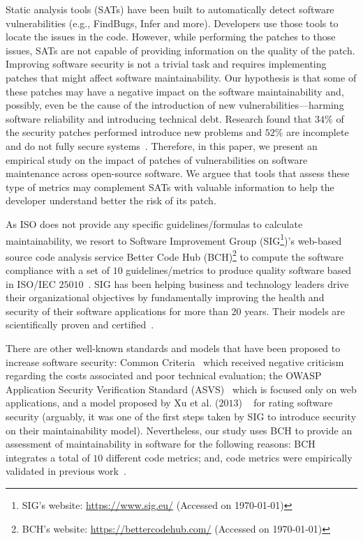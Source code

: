 \documentclass[smallextended]{svjour3}       %
\begin{document}
%
Static analysis tools (SATs) have been built to automatically detect software 
vulnerabilities (e.g., FindBugs, Infer and more). Developers
use those tools to locate the issues in the code. However,
while performing the patches to those issues, SATs are not 
capable of providing information on the quality of the patch.
Improving software security is not a trivial task and 
requires implementing patches that might affect software 
maintainability. Our hypothesis is that some of these patches may 
have a negative impact on the software maintainability and, 
possibly, even be the cause of the introduction of new 
vulnerabilities---harming software reliability and introducing 
technical debt. Research found that $34\%$ of the security patches 
performed introduce new problems and $52\%$ are incomplete and do not 
fully secure systems~\cite{10.1145/3133956.3134072}. Therefore, in this paper, 
we present an empirical study on the impact of patches of 
vulnerabilities on software maintenance across open-source software.
We arguee that tools that assess these type of metrics may
complement SATs with valuable information to help the developer
understand better the risk of its patch.

As ISO does not provide any specific guidelines/formulas to 
calculate maintainability, we resort to Software Improvement Group 
(SIG\footnote{SIG's website: 
\url{https://www.sig.eu/} (Accessed on \today{})})'s web-based source 
code analysis service Better Code Hub (BCH)\footnote{BCH's 
website: \url{https://bettercodehub.com/} (Accessed on \today{})}  
to compute the software compliance with a set of $10$ 
guidelines/metrics to produce quality software based in ISO/IEC 
$25010$~\cite{Visser:2016:OREILLY}. SIG 
has been helping business and technology leaders drive their organizational 
objectives by fundamentally improving the health and security of 
their software applications for more than 20 years. Their 
models are scientifically proven and certified~\cite{4335232,5609747,6113040,baggen2012}.

There are other well-known 
standards and models that have been proposed to increase software 
security: Common Criteria~\cite{common:2009} which received
negative criticism regarding the costs associated and poor technical 
evaluation; the OWASP Application Security Verification 
Standard (ASVS)~\cite{oswap:2009} which is focused only on web 
applications, and a model proposed by Xu et al. ($2013$)
~\cite{6616351} for rating software security (arguably, it was one 
of the first steps taken by SIG to introduce security on their 
maintainability model). Nevertheless, our study uses BCH to provide 
an assessment of maintainability in software for the following 
reasons: BCH integrates a total of $10$ different code metrics; and, 
code metrics were empirically validated in previous 
work~\cite{Bijlsma:2012:FIR:2317098.2317124,8530041,8919169,8785997}.
\end{document}
